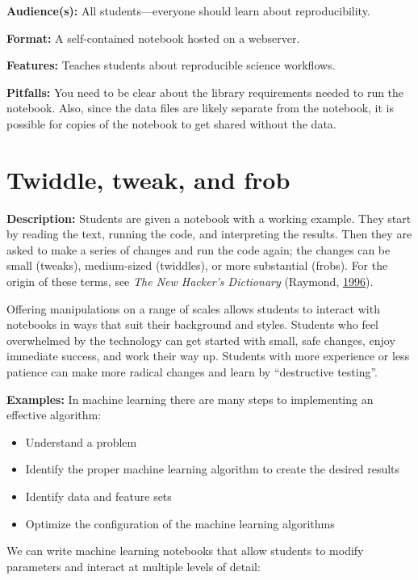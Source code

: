 \documentclass[]{book}
\providecommand{\tightlist}{%
  \setlength{\itemsep}{0pt}\setlength{\parskip}{0pt}}
\begin{document}
\textbf{Audience(s):} All students---everyone should learn about
reproducibility.

\textbf{Format:} A self-contained notebook hosted on a webserver.

\textbf{Features:} Teaches students about reproducible science
workflows.

\textbf{Pitfalls:} You need to be clear about the library requirements
needed to run the notebook. Also, since the data files are likely
separate from the notebook, it is possible for copies of the notebook to
get shared without the data.

\section{Twiddle, tweak, and frob}\label{twiddle-tweak-and-frob}

\textbf{Description:} Students are given a notebook with a working
example. They start by reading the text, running the code, and
interpreting the results. Then they are asked to make a series of
changes and run the code again; the changes can be small (tweaks),
medium-sized (twiddles), or more substantial (frobs). For the origin of
these terms, see \emph{The New Hacker's Dictionary} (Raymond,
\protect\hyperlink{ref-raymond1996new}{1996}).

Offering manipulations on a range of scales allows students to interact
with notebooks in ways that suit their background and styles. Students
who feel overwhelmed by the technology can get started with small, safe
changes, enjoy immediate success, and work their way up. Students with
more experience or less patience can make more radical changes and learn
by ``destructive testing''.

\textbf{Examples:} In machine learning there are many steps to
implementing an effective algorithm:

\begin{itemize}
\tightlist
\item
  Understand a problem
\item
  Identify the proper machine learning algorithm to create the desired
  results
\item
  Identify data and feature sets
\item
  Optimize the configuration of the machine learning algorithms
\end{itemize}

We can write machine learning notebooks that allow students to modify
parameters and interact at multiple levels of detail:
\end{document}

